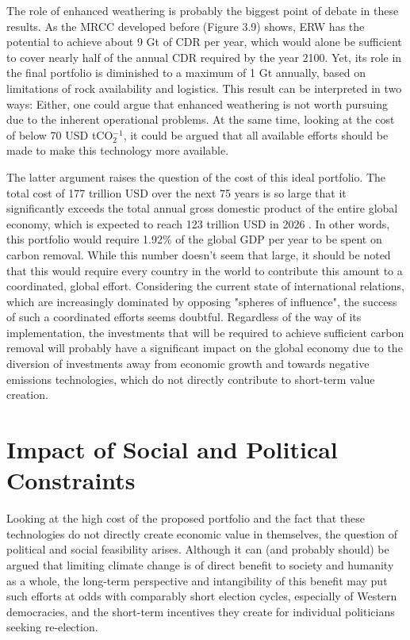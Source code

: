 The role of enhanced weathering is probably the biggest point of debate in these results. As the MRCC developed before (Figure 3.9) shows, ERW has the potential to achieve about 9 Gt of CDR per year, which would alone be sufficient to cover nearly half of the annual CDR required by the year 2100. Yet, its role in the final portfolio is diminished to a maximum of 1 Gt annually, based on limitations of rock availability and logistics. This result can be interpreted in two ways: Either, one could argue that enhanced weathering is not worth pursuing due to the inherent operational problems. At the same time, looking at the cost of below 70 USD tCO$_2^{-1}$, it could be argued that all available efforts should be made to make this technology more available.\vspace{2mm}

The latter argument raises the question of the cost of this ideal portfolio. The total cost of 177 trillion USD over the next 75 years is so large that it significantly exceeds the total annual gross domestic product of the entire global economy, which is expected to reach 123 trillion USD in 2026 \parencite{imf_gdp_2026}. In other words, this portfolio would require 1.92\% of the global GDP per year to be spent on carbon removal. While this number doesn't seem that large, it should be noted that this would require every country in the world to contribute this amount to a coordinated, global effort. Considering the current state of international relations, which are increasingly dominated by opposing "spheres of influence", the success of such a coordinated efforts seems doubtful. Regardless of the way of its implementation, the investments that will be required to achieve sufficient carbon removal will probably have a significant impact on the global economy due to the diversion of investments away from economic growth and towards negative emissions technologies, which do not directly contribute to short-term value creation.

\section{Impact of Social and Political Constraints}
Looking at the high cost of the proposed portfolio and the fact that these technologies do not directly create economic value in themselves, the question of political and social feasibility arises. Although it can (and probably should) be argued that limiting climate change is of direct benefit to society and humanity as a whole, the long-term perspective and intangibility of this benefit may put such efforts at odds with comparably short election cycles, especially of Western democracies, and the short-term incentives they create for individual politicians seeking re-election.\vspace{2mm}


